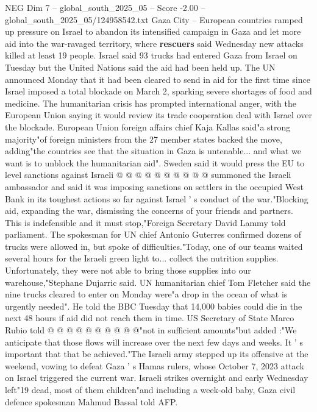 \begin{textsample}{NEG Dim 7 – global\_south\_2025\_05 – Score -2.00 – global\_south\_2025\_05/124958542.txt}  \label{ex:f7_neg_002}
Gaza City -- European countries ramped up pressure on Israel to abandon its intensified campaign in Gaza and let more aid into the war-ravaged territory, where \textbf{rescuers} said Wednesday new attacks killed at least 19 people.
Israel said 93 trucks had entered Gaza from Israel on Tuesday but the United Nations said the aid had been held up.
The UN announced Monday that it had been cleared to send in aid for the first time since Israel imposed a total blockade on March 2, sparking severe shortages of food and medicine.
The humanitarian crisis has prompted international anger, with the European Union saying it would review its trade cooperation deal with Israel over the blockade.
European Union foreign affairs chief Kaja Kallas said"a strong majority"of foreign ministers from the 27 member states backed the move, adding"the countries see that the situation in Gaza is untenable... and what we want is to unblock the humanitarian aid".
Sweden said it would press the EU to level sanctions against Israeli @ @ @ @ @ @ @ @ @ @ summoned the Israeli ambassador and said it was imposing sanctions on settlers in the occupied West Bank in its toughest actions so far against Israel ' s conduct of the war."Blocking aid, expanding the war, dismissing the concerns of your friends and partners.
This is indefensible and it must stop,"Foreign Secretary David Lammy told parliament.
The spokesman for UN chief Antonio Guterres confirmed dozens of trucks were allowed in, but spoke of difficulties."Today, one of our teams waited several hours for the Israeli green light to... collect the nutrition supplies.
Unfortunately, they were not able to bring those supplies into our warehouse,"Stephane Dujarric said.
UN humanitarian chief Tom Fletcher said the nine trucks cleared to enter on Monday were"a drop in the ocean of what is urgently needed".
He told the BBC Tuesday that 14,000 babies could die in the next 48 hours if aid did not reach them in time.
US Secretary of State Marco Rubio told @ @ @ @ @ @ @ @ @ @"not in sufficient amounts"but added :"We anticipate that those flows will increase over the next few days and weeks.
It ' s important that that be achieved."The Israeli army stepped up its offensive at the weekend, vowing to defeat Gaza ' s Hamas rulers, whose October 7, 2023 attack on Israel triggered the current war.
Israeli strikes overnight and early Wednesday left"19 dead, most of them children"and including a week-old baby, Gaza civil defence spokesman Mahmud Bassal told AFP.

\end{textsample}
